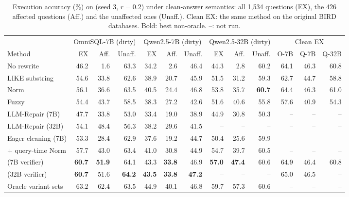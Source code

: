 \begin{table}[t]
\centering
\caption{Execution accuracy (\%) on \bench{} (seed 3, $r=0.2$) under clean-answer semantics: all 1{,}534 questions (EX), the 426 affected questions (Aff.) and the unaffected ones (Unaff.). Clean EX: the same method on the original BIRD databases. Bold: best non-oracle. --: not run.}
\label{tab:main}
\small
\setlength{\tabcolsep}{3.5pt}

\begin{tabular}{lrrrrrrrrrrrr}
\toprule
 & \multicolumn{3}{c}{OmniSQL-7B (dirty)} & \multicolumn{3}{c}{Qwen2.5-7B (dirty)} & \multicolumn{3}{c}{Qwen2.5-32B (dirty)} & \multicolumn{3}{c}{Clean EX}\\
\cmidrule(lr){2-4} \cmidrule(lr){5-7} \cmidrule(lr){8-10} \cmidrule(lr){11-13}
Method & EX & Aff. & Unaff. & EX & Aff. & Unaff. & EX & Aff. & Unaff. & O-7B & Q-7B & Q-32B\\
\midrule
No rewrite & 46.2 & 1.6 & 63.3 & 34.2 & 2.6 & 46.4 & 44.3 & 2.8 & 60.2 & 64.1 & 46.3 & 60.8 \\
LIKE substring & 54.6 & 33.8 & 62.6 & 38.9 & 20.7 & 45.9 & 51.5 & 31.2 & 59.3 & 62.7 & 44.7 & 58.8 \\
Norm & 56.1 & 36.6 & 63.5 & 40.5 & 24.4 & 46.8 & 53.8 & 35.7 & \textbf{60.7} & 64.4 & 46.3 & 61.0 \\
Fuzzy & 54.4 & 43.7 & 58.5 & 38.3 & 27.2 & 42.6 & 51.6 & 40.6 & 55.8 & 57.6 & 40.9 & 54.3 \\
\midrule
LLM-Repair (7B) & 47.7 & 33.8 & 53.0 & 33.4 & 19.0 & 38.9 & 44.9 & 30.8 & 50.3 & -- & -- & -- \\
LLM-Repair (32B) & 54.1 & 48.4 & 56.3 & 38.2 & 29.6 & 41.5 & -- & -- & -- & -- & -- & -- \\
Eager cleaning (7B) & 53.3 & 28.4 & 62.9 & 37.6 & 19.2 & 44.7 & 50.4 & 25.6 & 59.9 & -- & -- & -- \\
\quad $+$ query-time Norm & 57.7 & 43.0 & 63.4 & 41.0 & 30.8 & 44.9 & 54.7 & 39.7 & 60.5 & -- & -- & -- \\
\midrule
\sys{} (7B verifier) & \textbf{60.7} & \textbf{51.9} & 64.1 & 43.3 & \textbf{33.8} & 46.9 & \textbf{57.0} & \textbf{47.4} & 60.6 & 64.9 & 46.4 & 60.8 \\
\sys{} (32B verifier) & \textbf{60.7} & 51.6 & \textbf{64.2} & \textbf{43.5} & \textbf{33.8} & \textbf{47.2} & -- & -- & -- & 65.0 & 46.5 & -- \\
Oracle variant sets & 63.2 & 62.4 & 63.5 & 44.9 & 40.1 & 46.8 & 59.7 & 57.3 & 60.6 & -- & -- & -- \\
\bottomrule
\end{tabular}
\end{table}
